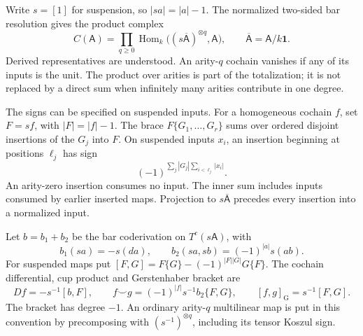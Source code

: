 Write $s=[1]$ for suspension, so $|sa|=|a|-1$.
The normalized two-sided bar resolution gives the product
complex
\begin{equation}\label{cycen:eq:bar}
 C(\mathsf A)=\prod_{q\geq0}
  \operatorname{Hom}_k\bigl((s\overline{\mathsf A})^{\otimes q},
                                  \mathsf A\bigr),
 \qquad \overline{\mathsf A}=\mathsf A/k\mathbf1.
\end{equation}
Derived representatives are understood. An arity-$q$ cochain
vanishes if any of its inputs is the unit. The product over
arities is part of the totalization; it is not replaced by a
direct sum when infinitely many arities contribute in one degree.

The signs can be specified on suspended inputs. For a
homogeneous cochain $f$, set $F=sf$, with $|F|=|f|-1$.
The brace $F\{G_1,\ldots,G_r\}$ sums over ordered disjoint
insertions of the $G_j$ into $F$. On suspended inputs $x_i$,
an insertion beginning at positions $\ell_j$ has sign
\begin{equation}\label{cycen:eq:brace-sign}
 (-1)^{\sum_j|G_j|\sum_{i<\ell_j}|x_i|}.
\end{equation}
An arity-zero insertion consumes no input. The inner sum
includes inputs consumed by earlier inserted maps. Projection
to $s\overline{\mathsf A}$ precedes every insertion into a
normalized input.

Let $b=b_1+b_2$ be the bar coderivation on $T^c(s\mathsf A)$,
with
\[
 b_1(sa)=-s(da),\qquad b_2(sa,sb)=(-1)^{|a|}s(ab).
\]
For suspended maps put
$[F,G]=F\{G\}-(-1)^{|F||G|}G\{F\}$.
The cochain differential, cup product and Gerstenhaber bracket
are
\begin{equation}\label{cycen:eq:operations}
 Df=-s^{-1}[b,F],\qquad
 f\smile g=(-1)^{|f|}s^{-1}b_2\{F,G\},\qquad
 [f,g]_{\mathrm G}=s^{-1}[F,G].
\end{equation}
The bracket has degree $-1$.
An ordinary arity-$q$ multilinear map is put in this
convention by precomposing with $(s^{-1})^{\otimes q}$,
including its tensor Koszul sign.

